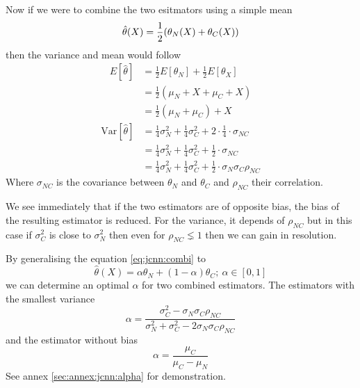 \documentclass[../main.tex]{subfiles}
\begin{document}
{{Now if we were to combine the two esitmators using a simple mean
\begin{equation}
  \label{eq:jcnn:combi}
  \hat{\theta}(X) = \frac{1}{2} ( \theta_{N}(X) + \theta_{C}(X) ) \\
\end{equation}
then the variance and mean would follow
\begin{align}
  E[\hat{\theta}] & = \frac{1}{2}E[\theta_N] + \frac{1}{2}E[\theta_X]\\
                  & = \frac{1}{2}(\mu_N + X + \mu_C + X) \\
                  & = \frac{1}{2}(\mu_N + \mu_C) + X
\end{align}
\begin{align}
  \mathrm{Var}[\hat{\theta}] & = \frac{1}{4}\sigma^2_N + \frac{1}{4}\sigma^2_C + 2 \cdot \frac{1}{4} \cdot \sigma_{NC} \\
                             & = \frac{1}{4}\sigma^2_N + \frac{1}{4}\sigma^2_C + \frac{1}{2} \cdot \sigma_{NC} \\
                             & = \frac{1}{4}\sigma^2_N + \frac{1}{4}\sigma^2_C + \frac{1}{2} \cdot \sigma_{N} \sigma_C \rho_{NC}
\end{align}
Where $\sigma_{NC}$ is the covariance between $\theta_N$ and $\theta_C$ and $\rho_{NC}$ their correlation.

We see immediately that if the two estimators are of opposite bias, the bias of the resulting estimator is reduced. For the variance, it depends of $\rho_{NC}$ but in this case if $\sigma^2_C$ is close to $\sigma^2_N$ then even for $\rho_{NC} \lneq 1$ then we can gain in resolution.

By generalising the equation \ref{eq:jcnn:combi} to
\begin{equation}
  \hat{\theta}(X) = \alpha \theta_N + (1 - \alpha) \theta_C; ~ \alpha \in [0, 1]
\end{equation}
we can determine an optimal $\alpha$ for two combined estimators. The estimators with the smallest variance
\begin{equation}
  \alpha = \frac{\sigma_C^2 - \sigma_N \sigma_C \rho_{NC}}{\sigma_N^2 + \sigma_C^2 - 2\sigma_N \sigma_C \rho_{NC}}
\end{equation}
and the estimator without bias
\begin{equation}
  \alpha = \frac{\mu_C}{\mu_C - \mu_N}
\end{equation}
See annex \ref{sec:annex:jcnn:alpha} for demonstration.

}}
\end{document}
